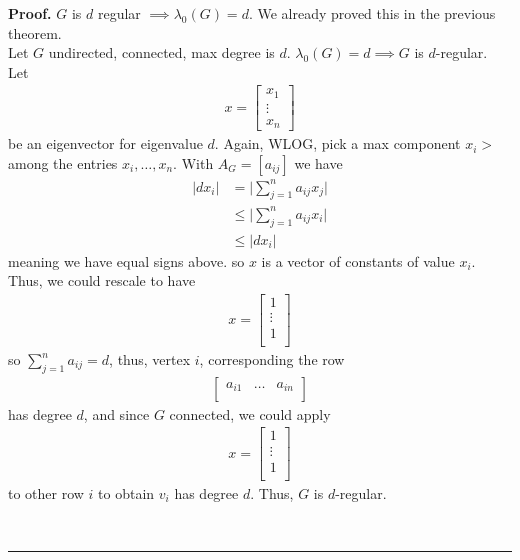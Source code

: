 \documentclass[12pt]{article}
\newenvironment{proof}[1][Proof]{\textbf{#1.} }{\ \rule{0.5em}{0.5em}}
\begin{document}
\begin{proof}
    $G$ is $d$ regular $\implies \lambda_0 (G) = d$.
    We already proved this in the previous theorem. \\
    Let $G$ undirected, connected, max degree is $d$.
    $\lambda_0(G) = d \implies G$ is $d$-regular. Let 
    \begin{align}
        x = 
        \begin{bmatrix}
            x_1\\
            \vdots\\
            x_n
        \end{bmatrix}
    \end{align}
    be an eigenvector for eigenvalue $d$.
    Again, WLOG, pick a max component $x_i >$ 
    among the entries $x_i, \ldots, x_n$. 
    With $A_G = \left[ a_{ij} \right]$ we have 
    \begin{align}
        \lvert d x_i \rvert &= \lvert \sum_{j=1}^n a_{ij} x_j \rvert\\
        &\leq \lvert \sum_{j=1}^n a_{ij} x_i \rvert\\
        &\leq \lvert d x_i \rvert
    \end{align}
    meaning we have equal signs above.
    so $x$ is a vector of constants of value $x_i$.
    Thus, we could rescale to have 
    \begin{align}
        x =
        \begin{bmatrix}
            1\\
            \vdots\\
            1\\
        \end{bmatrix}
    \end{align}
    so $\sum_{j=1}^n a_{ij} = d$,
    thus, vertex $i$, corresponding the row 
    \begin{align}
        \begin{bmatrix}
            a_{i1} & \ldots & a_{in}\\
        \end{bmatrix}
    \end{align}
    has degree $d$, and since $G$ connected,
    we could apply 
    \begin{align}
        x =
        \begin{bmatrix}
            1\\
            \vdots\\
            1\\
        \end{bmatrix}
    \end{align}
    to other row $i$
    to obtain $v_i$ 
    has degree $d$.
    Thus, $G$ is $d$-regular.
    
\end{proof}
\end{document}
